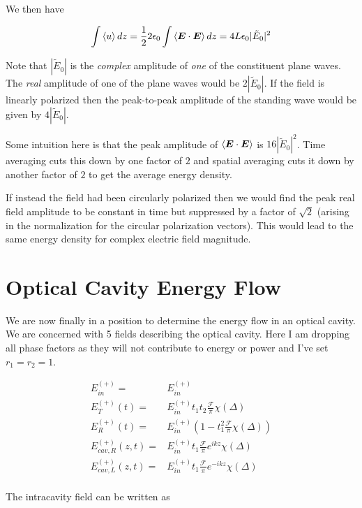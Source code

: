 \documentclass[12pt]{article}
\newcommand{\ep}{\epsilon}
\renewcommand{\vec}[1]{\boldsymbol{#1}}
\begin{document}
We then have

\begin{align}
\int \Braket{u} dz = \frac{1}{2} 2\ep_0 \int \Braket{\vec{E}\cdot\vec{E}} dz = 4L\ep_0|\tilde{E}_0|^2
\end{align}

Note that $|\tilde{E}_0|$ is the \textit{complex} amplitude of \textit{one} of the constituent plane waves.
The \textit{real} amplitude of one of the plane waves would be $2|\tilde{E}_0|$.
If the field is linearly polarized then the peak-to-peak amplitude of the standing wave would be given by $4|\tilde{E}_0|$.

Some intuition here is that the peak amplitude of $\Braket{\vec{E}\cdot\vec{E}}$ is $16|\tilde{E}_0|^2$.
Time averaging cuts this down by one factor of $2$ and spatial averaging cuts it down by another factor of $2$ to get the average energy density.

If instead the field had been circularly polarized then we would find the peak real field amplitude to be constant in time but suppressed by a factor of $\sqrt{2}$ (arising in the normalization for the circular polarization vectors).
This would lead to the same energy density for complex electric field magnitude.

\section{Optical Cavity Energy Flow}

We are now finally in a position to determine the energy flow in an optical cavity.
We are concerned with 5 fields describing the optical cavity.
Here I am dropping all phase factors as they will not contribute to energy or power and I've set $r_1=r_2=1$.

\begin{align}
E^{(+)}_{in} =& E^{(+)}_{in}\\
E^{(+)}_T(t) =& E^{(+)}_{in} t_1t_2\frac{\mathcal{F}}{\pi} \chi(\Delta)\\
E^{(+)}_R(t) =& E^{(+)}_{in}\left(1-t_1^2\frac{\mathcal{F}}{\pi}\chi(\Delta)\right)\\
E^{(+)}_{cav,R}(z,t) =& E^{(+)}_{in} t_1\frac{\mathcal{F}}{\pi}e^{ikz}\chi(\Delta)\\
E^{(+)}_{cav,L}(z,t) =& E^{(+)}_{in} t_1\frac{\mathcal{F}}{\pi}e^{-ikz}\chi(\Delta)\\
\end{align}

The intracavity field can be written as
\end{document}
